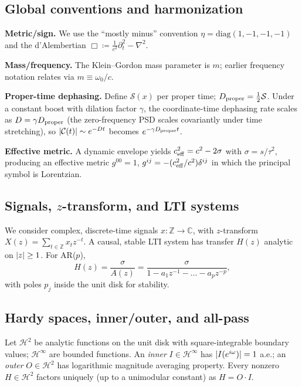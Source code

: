 \documentclass[12pt]{article}
\theoremstyle{definition}
\newcommand{\C}{\mathbb{C}}
\newcommand{\Z}{\mathbb{Z}}
\newcommand{\defeq}{\coloneqq}
\DeclarePairedDelimiter{\abs}{\lvert}{\rvert}
\newcommand{\Hinf}{\mathcal{H}^\infty}
\newcommand{\Htwo}{\mathcal{H}^2}
\begin{document}
\subsection*{Global conventions and harmonization}
\begin{summarybox}
\textbf{Metric/sign.} We use the ``mostly minus'' convention $\eta=\mathrm{diag}(1,-1,-1,-1)$ and the d'Alembertian
\(
\Box\defeq \frac{1}{c^2}\partial_t^2-\nabla^2.
\)

\textbf{Mass/frequency.} The Klein--Gordon mass parameter is $m$; earlier frequency notation relates via $m\equiv \omega_0/c$.

\textbf{Proper-time dephasing.} Define $\mathcal S(x)$ per proper time; $D_{\rm proper}=\tfrac12\mathcal S$.
Under a constant boost with dilation factor $\gamma$, the coordinate-time dephasing rate scales as
$D=\gamma D_{\rm proper}$ (the zero-frequency PSD scales covariantly under time stretching), so
$\abs{\mathcal C(t)}\sim e^{-Dt}$ becomes $e^{-\gamma D_{\rm proper} t}$.

\textbf{Effective metric.} A dynamic envelope yields $c_{\rm eff}^2=c^2-2\sigma$ with $\sigma=s/\tau^2$, producing an effective metric $g^{00}=1$, $g^{ij}=-(c_{\rm eff}^2/c^2)\delta^{ij}$ in which the principal symbol is Lorentzian.
\end{summarybox}

\subsection{Signals, $z$-transform, and LTI systems}
We consider complex, discrete-time signals $x:\Z\to\C$, with $z$-transform $X(z)=\sum_{t\in\Z} x_t z^{-t}$. A causal, stable LTI system has transfer $H(z)$ analytic on $\abs{z}\ge1$. For AR($p$),
\begin{equation}
H(z)=\frac{\sigma}{A(z)}=\frac{\sigma}{1-a_1 z^{-1}-\dots-a_p z^{-p}},
\end{equation}
with poles $p_j$ inside the unit disk for stability.

\subsection{Hardy spaces, inner/outer, and all-pass}
Let $\Htwo$ be analytic functions on the unit disk with square-integrable boundary values; $\Hinf$ are bounded functions. An \emph{inner} $I\in\Hinf$ has $\abs{I(e^{i\omega})}=1$ a.e.; an \emph{outer} $O\in\Htwo$ has logarithmic magnitude averaging property. Every nonzero $H\in\Htwo$ factors uniquely (up to a unimodular constant) as $H=O\cdot I$.
\end{document}
